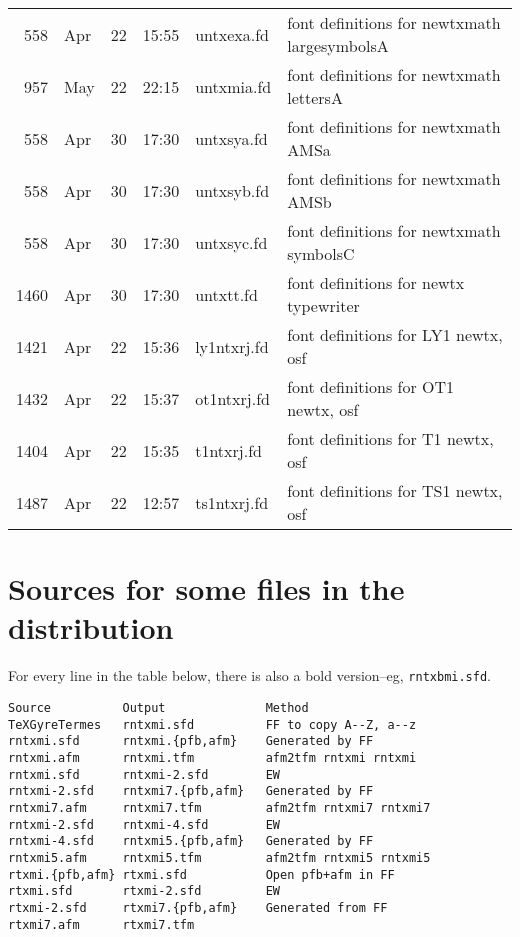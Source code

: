 \documentclass[10pt]{amsart}
\begin{document}
\begin{center}
\begin{longtable}{@{} rlrrll @{}}
558&Apr&22&15:55&untxexa.fd& font definitions for newtxmath largesymbolsA\\
957&May&22&22:15&untxmia.fd& font definitions for newtxmath lettersA\\
558&Apr&30&17:30&untxsya.fd& font definitions for newtxmath AMSa\\
558&Apr&30&17:30&untxsyb.fd& font definitions for newtxmath AMSb\\
558&Apr&30&17:30&untxsyc.fd& font definitions for newtxmath symbolsC\\
1460&Apr&30&17:30&untxtt.fd& font definitions for newtx typewriter\\
1421&Apr&22&15:36&ly1ntxrj.fd& font definitions for LY1 newtx, osf\\
1432&Apr&22&15:37&ot1ntxrj.fd& font definitions for OT1 newtx, osf\\
1404&Apr&22&15:35&t1ntxrj.fd& font definitions for T1 newtx, osf\\
1487&Apr&22&12:57&ts1ntxrj.fd& font definitions for TS1 newtx, osf\\
    \bottomrule
  \end{longtable}
\end{center}
\section{Sources for some files in the distribution}
 For every line in the table below, there is also a bold version--eg, {\tt rntxbmi.sfd}.
\begin{verbatim}
Source          Output              Method
TeXGyreTermes   rntxmi.sfd          FF to copy A--Z, a--z
rntxmi.sfd      rntxmi.{pfb,afm}    Generated by FF
rntxmi.afm      rntxmi.tfm          afm2tfm rntxmi rntxmi
rntxmi.sfd      rntxmi-2.sfd        EW
rntxmi-2.sfd    rntxmi7.{pfb,afm}   Generated by FF
rntxmi7.afm     rntxmi7.tfm         afm2tfm rntxmi7 rntxmi7
rntxmi-2.sfd    rntxmi-4.sfd        EW
rntxmi-4.sfd    rntxmi5.{pfb,afm}   Generated by FF
rntxmi5.afm     rntxmi5.tfm         afm2tfm rntxmi5 rntxmi5
rtxmi.{pfb,afm} rtxmi.sfd           Open pfb+afm in FF
rtxmi.sfd       rtxmi-2.sfd         EW
rtxmi-2.sfd     rtxmi7.{pfb,afm}    Generated from FF
rtxmi7.afm      rtxmi7.tfm          
\end{verbatim}
\end{document}
